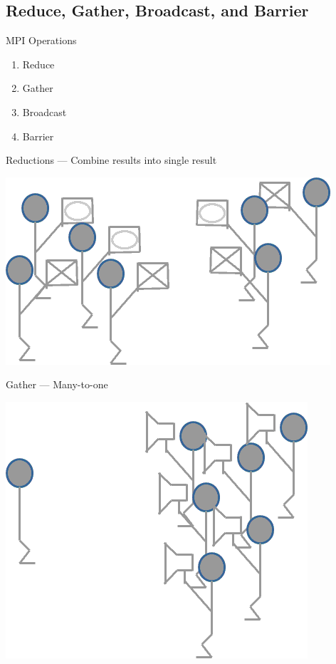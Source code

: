 \subsection{Reduce, Gather, Broadcast, and Barrier}


\begin{frame}
  \begin{block}{MPI Operations}
    \begin{enumerate}
      \item Reduce
      \item Gather
      \item Broadcast
      \item Barrier
    \end{enumerate}
  \end{block}
\end{frame}

\begin{frame}
  \begin{block}{Reductions --- Combine results into single result}
    \begin{center}
      \includegraphics[scale=.6]{pics/mpi_reduce}
    \end{center}
  \end{block}
\end{frame}


\begin{frame}
  \begin{block}{Gather --- Many-to-one}
    \begin{center}
      \includegraphics[scale=.6]{pics/mpi_gather}
    \end{center}
  \end{block}
\end{frame}


